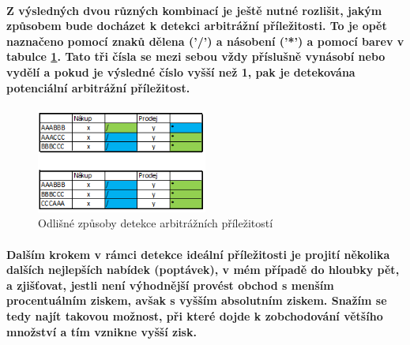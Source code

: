 \documentclass[thesis=B,czech]{FITthesis}[2019/03/21]
\begin{document}
\paragraph{
Z výsledných dvou různých kombinací je ještě nutné rozlišit, jakým způsobem bude docházet k detekci arbitrážní příležitosti. To je opět naznačeno pomocí znaků dělena ('/') a násobení ('*') a pomocí barev v tabulce \ref{2_kombinace}. Tato tři čísla se mezi sebou vždy příslušně vynásobí nebo vydělí a pokud je výsledné číslo vyšší než 1, pak je detekována potenciální arbitrážní příležitost. 
}
\begin{figure}\centering
	\includegraphics[width=0.5\textwidth]{images/2_kombinace.PNG}
	\caption{Odlišné způsoby detekce arbitrážních příležitostí}\label{2_kombinace}
\end{figure}
\paragraph{
Dalším krokem v rámci detekce ideální příležitosti je projití několika dalších nejlepších nabídek (poptávek), v mém případě do hloubky pět, a zjišťovat, jestli není výhodnější provést obchod s menším procentuálním ziskem, avšak s vyšším absolutním ziskem. Snažím se tedy najít takovou možnost, při které dojde k zobchodování většího množství a tím vznikne vyšší zisk.
}
\end{document}
